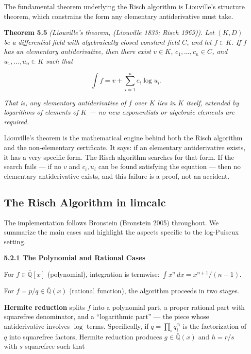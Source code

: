\documentclass[12pt]{article}
\begin{document}
The fundamental theorem underlying the Risch algorithm is Liouville's
structure theorem, which constrains the form any elementary
antiderivative must take.

\textbf{Theorem 5.5} \emph{(Liouville's theorem, (Liouville 1833; Risch
1969)).} \emph{Let \((K, D)\) be a differential field with algebraically
closed constant field \(C\), and let \(f \in K\). If \(f\) has an
elementary antiderivative, then there exist \(v \in K\),
\(c_1, \ldots, c_n \in C\), and \(u_1, \ldots, u_n \in K\) such that}

\[\int f = v + \sum_{i=1}^n c_i \log u_i.\]

\emph{That is, any elementary antiderivative of \(f\) over \(K\) lies in
\(K\) itself, extended by logarithms of elements of \(K\) --- no new
exponentials or algebraic elements are required.}

Liouville's theorem is the mathematical engine behind both the Risch
algorithm and the non-elementary certificate. It says: if an elementary
antiderivative exists, it has a very specific form. The Risch algorithm
searches for that form. If the search fails --- if no \(v\) and
\(c_i, u_i\) can be found satisfying the equation --- then no elementary
antiderivative exists, and this failure is a proof, not an accident.




\subsection{The Risch Algorithm in
limcalc}\label{the-risch-algorithm-in-limcalc}

The implementation follows Bronstein (Bronstein 2005) throughout. We
summarize the main cases and highlight the aspects specific to the
log-Puiseux setting.

\textbf{5.2.1 The Polynomial and Rational Cases}

For \(f \in \bar{\mathbb{Q}}[x]\) (polynomial), integration is termwise:
\(\int x^n\,dx = x^{n+1}/(n+1)\).

For \(f = p/q \in \bar{\mathbb{Q}}(x)\) (rational function), the
algorithm proceeds in two stages.

\textbf{Hermite reduction} splits \(f\) into a polynomial part, a proper
rational part with squarefree denominator, and a ``logarithmic part''
--- the piece whose antiderivative involves \(\log\) terms.
Specifically, if \(q = \prod_i q_i^{e_i}\) is the factorization of \(q\)
into squarefree factors, Hermite reduction produces
\(g \in \bar{\mathbb{Q}}(x)\) and \(h = r/s\) with \(s\) squarefree such
that
\end{document}
